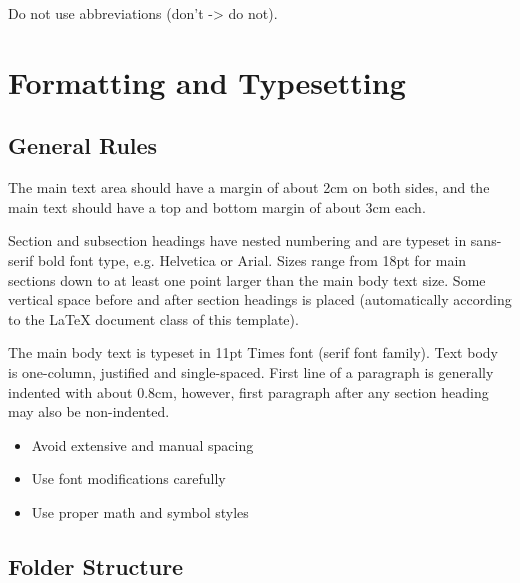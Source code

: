 \documentclass[11pt, a4paper,oneside,chapterprefix=false]{scrbook}
\begin{document}
Do not use abbreviations (don't -> do not).

\section*{Formatting and Typesetting} \label{sec:formatting}

\subsection*{General Rules}

The main text area should have a margin of about 2cm on both sides, and the main text should have a top and bottom margin of about 3cm each.

Section and subsection headings have nested numbering and are typeset in sans-serif bold font type, e.g. Helvetica or Arial.  Sizes range from 18pt for main sections down to at least one point larger than the main body text size. Some vertical space before and after section headings is placed (automatically according to the LaTeX document class of this template).

The main body text is typeset in 11pt Times font (serif font family). Text body is one-column, justified and single-spaced. First line of a paragraph is generally indented with about 0.8cm, however, first paragraph after any section heading may also be non-indented.

\begin{itemize}
\item Avoid extensive and manual spacing
\item Use font modifications carefully
\item Use proper math and symbol styles
\end{itemize}

\subsection*{Folder Structure}
\end{document}
